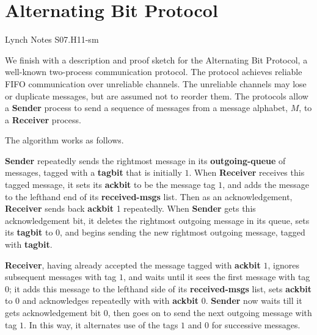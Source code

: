 
\newcommand{\prcef}[3]%
{\textbf{action}: #1\\
\textbf{precondition}: #2\\
\textbf{effect}: #3}
\iffalse

\newcommand{\iocode}[2]%
{\textbf{IOCode}\\
\textbf{group 1}: #1\\
\textbf{group 2}: #2}
\fi

\section{Alternating Bit Protocol}

\begin{editingnotes}
Lynch Notes S07.H11-sm
\end{editingnotes}

We finish with a description and proof sketch for the Alternating Bit
Protocol, a well-known two-process communication protocol.  The
protocol achieves reliable FIFO communication over unreliable
channels.  The unreliable channels may lose or duplicate messages, but
are assumed not to reorder them.  The protocols allow a \textbf{Sender}
process to send a sequence of messages from a message alphabet, $M$,
to a \textbf{Receiver} process.

The algorithm works as follows.

\textbf{Sender} repeatedly sends the rightmost message in its
\textbf{outgoing-queue} of messages, tagged with a \textbf{tagbit}
that is initially $1$.  When \textbf{Receiver} receives this tagged
message, it sets its \textbf{ackbit} to be the message tag $1$, and
adds the message to the lefthand end of its \textbf{received-msgs}
list.  Then as an acknowledgement, \textbf{Receiver} sends back
\textbf{ackbit} 1 repeatedly.  When \textbf{Sender} gets this
acknowledgement bit, it deletes the rightmost outgoing message in its
queue, sets its \textbf{tagbit} to 0, and begins sending the new
rightmost outgoing message, tagged with \textbf{tagbit}.

\textbf{Receiver}, having already accepted the message tagged with
\textbf{ackbit} $1$, ignores subsequent messages with tag $1$, and
waits until it sees the first message with tag $0$; it adds this
message to the lefthand side of its \textbf{received-msgs} list, sets
\textbf{ackbit} to 0 and acknowledges repeatedly with with
\textbf{ackbit} $0$.  \textbf{Sender} now waits till it gets
acknowledgement bit $0$, then goes on to send the next outgoing
message with tag $1$.  In this way, it alternates use of the tags $1$
and $0$ for successive messages.

